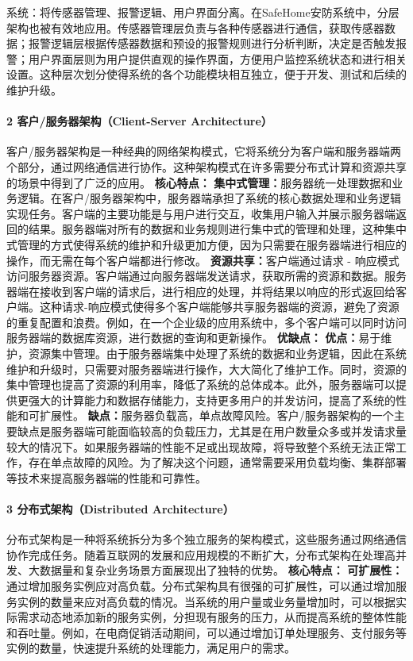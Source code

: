 系统：将传感器管理、报警逻辑、用户界面分离。在SafeHome安防系统中，分层架构也被有效地应用。传感器管理层负责与各种传感器进行通信，获取传感器数据；报警逻辑层根据传感器数据和预设的报警规则进行分析判断，决定是否触发报警；用户界面层则为用户提供直观的操作界面，方便用户监控系统状态和进行相关设置。这种层次划分使得系统的各个功能模块相互独立，便于开发、测试和后续的维护升级。 \paragraph{2 客户/服务器架构（Client-Server Architecture）}\label{ux5ba2ux6237ux670dux52a1ux5668ux67b6ux6784client-server-architecture} 客户/服务器架构是一种经典的网络架构模式，它将系统分为客户端和服务器端两个部分，通过网络通信进行协作。这种架构模式在许多需要分布式计算和资源共享的场景中得到了广泛的应用。 \textbf{核心特点：} \textbf{集中式管理：}服务器统一处理数据和业务逻辑。在客户/服务器架构中，服务器端承担了系统的核心数据处理和业务逻辑实现任务。客户端的主要功能是与用户进行交互，收集用户输入并展示服务器端返回的结果。服务器端对所有的数据和业务规则进行集中式的管理和处理，这种集中式管理的方式使得系统的维护和升级更加方便，因为只需要在服务器端进行相应的操作，而无需在每个客户端都进行修改。 \textbf{资源共享：}客户端通过请求 - 响应模式访问服务器资源。客户端通过向服务器端发送请求，获取所需的资源和数据。服务器端在接收到客户端的请求后，进行相应的处理，并将结果以响应的形式返回给客户端。这种请求-响应模式使得多个客户端能够共享服务器端的资源，避免了资源的重复配置和浪费。例如，在一个企业级的应用系统中，多个客户端可以同时访问服务器端的数据库资源，进行数据的查询和更新操作。 \textbf{优缺点：} \textbf{优点：}易于维护，资源集中管理。由于服务器端集中处理了系统的数据和业务逻辑，因此在系统维护和升级时，只需要对服务器端进行操作，大大简化了维护工作。同时，资源的集中管理也提高了资源的利用率，降低了系统的总体成本。此外，服务器端可以提供更强大的计算能力和数据存储能力，支持更多用户的并发访问，提高了系统的性能和可扩展性。 \textbf{缺点：}服务器负载高，单点故障风险。客户/服务器架构的一个主要缺点是服务器端可能面临较高的负载压力，尤其是在用户数量众多或并发请求量较大的情况下。如果服务器端的性能不足或出现故障，将导致整个系统无法正常工作，存在单点故障的风险。为了解决这个问题，通常需要采用负载均衡、集群部署等技术来提高服务器端的性能和可靠性。 \paragraph{3 分布式架构（Distributed Architecture）}\label{ux5206ux5e03ux5f0fux67b6ux6784distributed-architecture} 分布式架构是一种将系统拆分为多个独立服务的架构模式，这些服务通过网络通信协作完成任务。随着互联网的发展和应用规模的不断扩大，分布式架构在处理高并发、大数据量和复杂业务场景方面展现出了独特的优势。 \textbf{核心特点：} \textbf{可扩展性：}通过增加服务实例应对高负载。分布式架构具有很强的可扩展性，可以通过增加服务实例的数量来应对高负载的情况。当系统的用户量或业务量增加时，可以根据实际需求动态地添加新的服务实例，分担现有服务的压力，从而提高系统的整体性能和吞吐量。例如，在电商促销活动期间，可以通过增加订单处理服务、支付服务等实例的数量，快速提升系统的处理能力，满足用户的需求。 